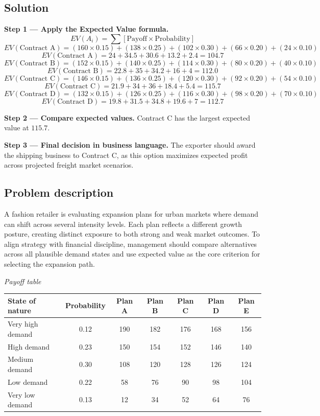 \begin{ExamProblems}
		\subsection*{Solution}
		\textbf{Step 1 --- Apply the Expected Value formula.}
		\[
		EV(A_i)=\sum [\text{Payoff}\times\text{Probability}]
		\]
		\[
		EV(\text{Contract A})=(160\times0.15)+(138\times0.25)+(102\times0.30)+(66\times0.20)+(24\times0.10)
		\]
		\[
		EV(\text{Contract A})=24+34.5+30.6+13.2+2.4=104.7
		\]
		\[
		EV(\text{Contract B})=(152\times0.15)+(140\times0.25)+(114\times0.30)+(80\times0.20)+(40\times0.10)
		\]
		\[
		EV(\text{Contract B})=22.8+35+34.2+16+4=112.0
		\]
		\[
		EV(\text{Contract C})=(146\times0.15)+(136\times0.25)+(120\times0.30)+(92\times0.20)+(54\times0.10)
		\]
		\[
		EV(\text{Contract C})=21.9+34+36+18.4+5.4=115.7
		\]
		\[
		EV(\text{Contract D})=(132\times0.15)+(126\times0.25)+(116\times0.30)+(98\times0.20)+(70\times0.10)
		\]
		\[
		EV(\text{Contract D})=19.8+31.5+34.8+19.6+7=112.7
		\]
		
		\textbf{Step 2 --- Compare expected values.}
		Contract C has the largest expected value at $115.7$.
		
		\textbf{Step 3 --- Final decision in business language.}
		The exporter should award the shipping business to Contract C, as this option maximizes expected profit across projected freight market scenarios.
		
		\item
		\subsection*{Problem description}
		A fashion retailer is evaluating expansion plans for urban markets where demand can shift across several intensity levels. Each plan reflects a different growth posture, creating distinct exposure to both strong and weak market outcomes. To align strategy with financial discipline, management should compare alternatives across all plausible demand states and use expected value as the core criterion for selecting the expansion path.

		\begin{center}
			\textit{Payoff table} \par
			\begin{tabular}{l c c c c c c}
				\toprule
				State of nature & Probability & Plan A & Plan B & Plan C & Plan D & Plan E \\
				\midrule
				Very high demand & 0.12 & 190 & 182 & 176 & 168 & 156 \\
				High demand & 0.23 & 150 & 154 & 152 & 146 & 140 \\
				Medium demand & 0.30 & 108 & 120 & 128 & 126 & 124 \\
				Low demand & 0.22 & 58 & 76 & 90 & 98 & 104 \\
				Very low demand & 0.13 & 12 & 34 & 52 & 64 & 76 \\
				\bottomrule
			\end{tabular}
		\end{center}


\end{ExamProblems}
